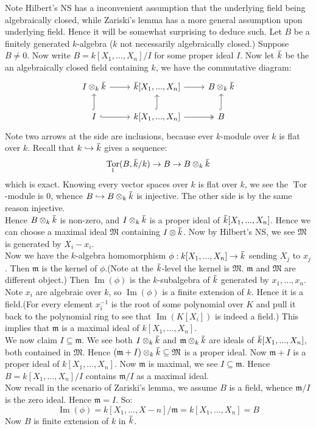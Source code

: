 \documentclass[12pt]{article}
\theoremstyle{definition}
\theoremstyle{plain}
\DeclareMathOperator{\im}{Im}
\DeclareMathOperator{\Tor}{Tor}
\newcommand{\inj}{\hookrightarrow}
\newcommand{\overbar}[1]{\mkern 1.5mu\overline{\mkern-1.5mu#1\mkern-1.5mu}\mkern 1.5mu}
\renewcommand{\bar}{\overbar}
\begin{document}
\medskip
Note Hilbert's NS has a inconvenient assumption that the underlying field being algebraically closed, while Zariski's lemma has a more general assumption upon underlying field. Hence it will be somewhat surprising to deduce such.
 Let $B$ be a finitely generated $k$-algebra ($k$ not necessarily algebraically closed.) Suppose $B\neq 0$. Now write $B=k[X_1, ..., X_n]/I$ for some proper ideal $I$. Now let $\bar{k}$ be the an algebraically closed field containing $k$, we have the commutative diagram:
\begin{equation}
  \begin{tikzcd}
    I\otimes_k\bar{k} \rar &\bar{k}[X_1, ..., X_n]\rar &B\otimes_k \bar{k}\\
    I\rar[hook]\uar[hook]&k[X_1, ..., X_n]\rar[two heads]\uar[hook]&B\uar[hook]
  \end{tikzcd}
\end{equation}
Note two arrows at the side are inclusions, because ever $k$-module over $k$ is flat over $k$. Recall that $k\inj \bar{k}$ gives a sequence:
\[\Tor_1(B, \bar{k}/k)\to B\to B\otimes_k \bar{k}\]
which is exact. Knowing every vector spaces over $k$ is flat over $k$, we see the $\Tor$-module is $0$, whence $B\inj B\otimes_k \bar{k}$ is injective. The other side is by the same reason injective. \\
\indent Hence $B\otimes_k\bar{k}$ is non-zero, and $I\otimes_k \bar{k}$ is a proper ideal of $\bar{k}[X_1, ..., X_n]$. Hence we can choose a maximal ideal $\mathfrak{M}$ containing $I\otimes \bar{k}$. Now by Hilbert's NS, we see $\mathfrak{M}$ is generated by $ X_i-x_i$.\\
\indent Now we have the $k$-algebra homomorphism $\phi: k[X_1, ..., X_n]\to \bar{k}$ sending $X_j$ to $x_j$. Then $\mathfrak{m}$ is the kernel of $\phi$.(Note at the $\bar{k}$-level the kernel is $\mathfrak{M}$. $\mathfrak{m}$ and $\mathfrak{M}$ are different object.) Then $\im(\phi)$ is the $k$-subalgebra of $\bar{k}$ generated by $x_1, ..., x_n$. Note $x_i$ are algebraic over $k$, so $\im(\phi)$ is a finite extension of $k$. Hence it is a field.(For every element $x_i^{-1}$ is the root of some polynomial over $K$ and pull it back to the polynomial ring to see that $\im(K[X_i])$ is indeed a field.) This implies that $\mathfrak{m}$ is a maximal ideal of $k[X_1, ..., X_n]$.\\
\indent We now claim $I\subseteq \mathfrak{m}$. We see both $I\otimes_k \bar{k}$ and $\mathfrak{m}\otimes_k\bar{k}$ are ideals of $\bar{k}[X_1, ..., X_n]$, both contained in $\mathfrak{M}$. Hence $(\mathfrak{m}+I)\otimes_k \bar{k}\subseteq \mathfrak{M}$ is a proper ideal. Now $\mathfrak{m}+I$ is a proper ideal of $k[X_1, ..., X_n]$. Now $\mathfrak{m}$ is maximal, we see $I\subseteq \mathfrak{m}$. Hence $B=k[X_1, ..., X_n]/I$ contains $\mathfrak{m}/I$ as a maximal ideal.\\
\indent Now recall in the scenario of Zariski's lemma, we assume $B$ is a field, whence $\mathfrak{m}/I$ is the zero ideal. Hence $\mathfrak{m}=I$. So:
\[\im(\phi)=k[X_1, ..., X-n]/\mathfrak{m}=k[X_1, ..., X_n]=B\]
Now $B$ is finite extension of $k$ in $\bar{k}$. \qedhere
\end{document}
